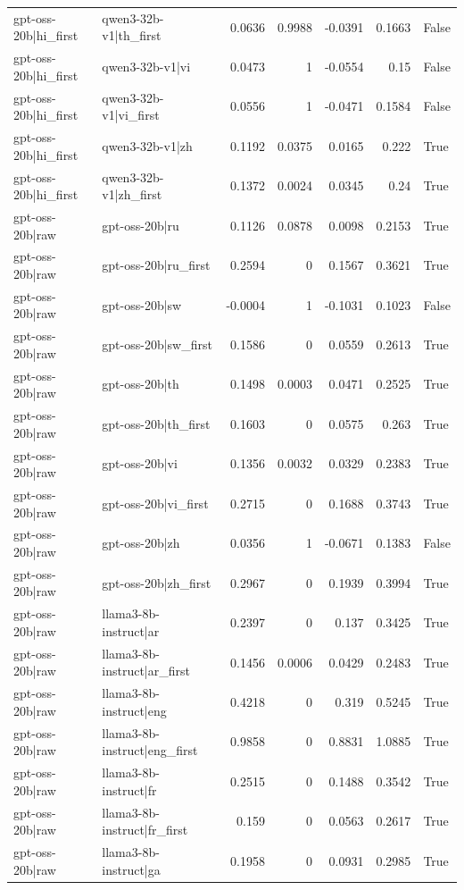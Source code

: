 \begin{table}
\begin{tabular}{l l r r r r l}
gpt-oss-20b|hi_first & qwen3-32b-v1|th_first & 0.0636 & 0.9988 & -0.0391 & 0.1663 & False \\
gpt-oss-20b|hi_first & qwen3-32b-v1|vi & 0.0473 & 1 & -0.0554 & 0.15 & False \\
gpt-oss-20b|hi_first & qwen3-32b-v1|vi_first & 0.0556 & 1 & -0.0471 & 0.1584 & False \\
gpt-oss-20b|hi_first & qwen3-32b-v1|zh & 0.1192 & 0.0375 & 0.0165 & 0.222 & True \\
gpt-oss-20b|hi_first & qwen3-32b-v1|zh_first & 0.1372 & 0.0024 & 0.0345 & 0.24 & True \\
gpt-oss-20b|raw & gpt-oss-20b|ru & 0.1126 & 0.0878 & 0.0098 & 0.2153 & True \\
gpt-oss-20b|raw & gpt-oss-20b|ru_first & 0.2594 & 0 & 0.1567 & 0.3621 & True \\
gpt-oss-20b|raw & gpt-oss-20b|sw & -0.0004 & 1 & -0.1031 & 0.1023 & False \\
gpt-oss-20b|raw & gpt-oss-20b|sw_first & 0.1586 & 0 & 0.0559 & 0.2613 & True \\
gpt-oss-20b|raw & gpt-oss-20b|th & 0.1498 & 0.0003 & 0.0471 & 0.2525 & True \\
gpt-oss-20b|raw & gpt-oss-20b|th_first & 0.1603 & 0 & 0.0575 & 0.263 & True \\
gpt-oss-20b|raw & gpt-oss-20b|vi & 0.1356 & 0.0032 & 0.0329 & 0.2383 & True \\
gpt-oss-20b|raw & gpt-oss-20b|vi_first & 0.2715 & 0 & 0.1688 & 0.3743 & True \\
gpt-oss-20b|raw & gpt-oss-20b|zh & 0.0356 & 1 & -0.0671 & 0.1383 & False \\
gpt-oss-20b|raw & gpt-oss-20b|zh_first & 0.2967 & 0 & 0.1939 & 0.3994 & True \\
gpt-oss-20b|raw & llama3-8b-instruct|ar & 0.2397 & 0 & 0.137 & 0.3425 & True \\
gpt-oss-20b|raw & llama3-8b-instruct|ar_first & 0.1456 & 0.0006 & 0.0429 & 0.2483 & True \\
gpt-oss-20b|raw & llama3-8b-instruct|eng & 0.4218 & 0 & 0.319 & 0.5245 & True \\
gpt-oss-20b|raw & llama3-8b-instruct|eng_first & 0.9858 & 0 & 0.8831 & 1.0885 & True \\
gpt-oss-20b|raw & llama3-8b-instruct|fr & 0.2515 & 0 & 0.1488 & 0.3542 & True \\
gpt-oss-20b|raw & llama3-8b-instruct|fr_first & 0.159 & 0 & 0.0563 & 0.2617 & True \\
gpt-oss-20b|raw & llama3-8b-instruct|ga & 0.1958 & 0 & 0.0931 & 0.2985 & True \\

\end{tabular}
\end{table}
